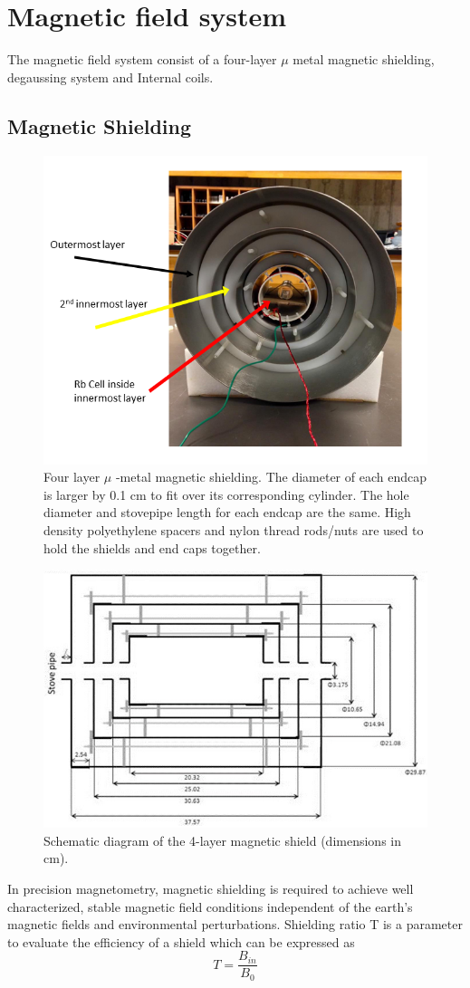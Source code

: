 \section{Magnetic field system}
The magnetic field system consist of a four-layer $\mu$ metal magnetic shielding, degaussing system and Internal coils.
\subsection{Magnetic Shielding}
\begin{figure}%
\centering
   \includegraphics[width=0.8\linewidth]{figures/magnetic_shielding}
 \caption{Four layer $\mu$ -metal magnetic shielding. The diameter of each endcap is larger by 0.1 cm to fit over its corresponding cylinder. The hole diameter and stovepipe length for each endcap are the same. High density polyethylene spacers and nylon thread rods/nuts are used to hold the shields and end caps together.}
\end{figure}
\begin{figure}%
\centering
\includegraphics[width=0.8\linewidth]{figures/shield.JPG}
 \caption{ Schematic diagram of the 4-layer magnetic shield (dimensions in cm).\label{fig:shield}}
\end{figure}
In precision magnetometry, magnetic shielding is required to achieve well characterized, stable magnetic field conditions independent of the earth’s magnetic fields and environmental perturbations. Shielding ratio T is a parameter to evaluate the efficiency of a shield which can be expressed as
\begin{equation}
 T = \frac{B_{in} }{B_0} 
\end{equation}

